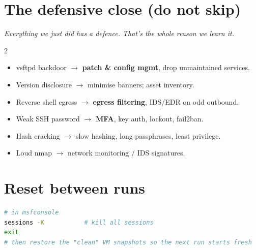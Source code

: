 \documentclass[10pt,a4paper]{article}
\newcommand{\say}[1]{\smallskip\noindent{\color{sayPurple}\textbf{Say:}}
  \textit{#1}\par\smallskip}
\begin{document}
\section{The defensive close (do not skip)}
\say{Everything we just did has a defence. That's the whole reason we learn it.}
\begin{multicols}{2}\small
\begin{itemize}[leftmargin=1.2em, itemsep=1pt]
  \item vsftpd backdoor $\to$ \textbf{patch \& config mgmt}, drop unmaintained
        services.
  \item Version disclosure $\to$ minimise banners; asset inventory.
  \item Reverse shell egress $\to$ \textbf{egress filtering}, IDS/EDR on odd
        outbound.
  \item Weak SSH password $\to$ \textbf{MFA}, key auth, lockout, fail2ban.
  \item Hash cracking $\to$ slow hashing, long passphrases, least privilege.
  \item Loud nmap $\to$ network monitoring / IDS signatures.
\end{itemize}
\end{multicols}

\section{Reset between runs}
\begin{lstlisting}[language=bash]
# in msfconsole
sessions -K           # kill all sessions
exit
# then restore the "clean" VM snapshots so the next run starts fresh
\end{lstlisting}

\end{document}
